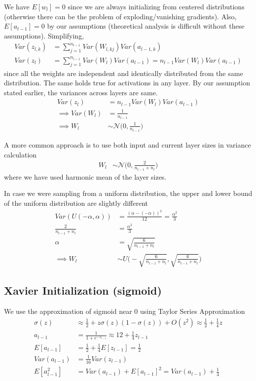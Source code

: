 \documentclass[../../deep_learning_notes.tex]{subfiles}
\begin{document}
We have $E[w_{l}] = 0$ since we are always initializing from centered distributions (otherwise there can be the problem of exploding/vanishing gradients). Also, $E[a_{l-1}] = 0$ by our assumptions (theoretical analysis is difficult without these assumptions). Simplifying,
\begin{align*}
    Var(z_{l, k}) &= \sum_{j=1}^{n_{l-1}} Var(W_{l, kj})Var(a_{l-1, k})\\
    Var(z_{l}) &= \sum_{j=1}^{n_{l-1}} Var(W_{l})Var(a_{l-1}) = n_{l-1}Var(W_{l})Var(a_{l-1})
\end{align*}
since all the weights are independent and identically distributed from the same distribution. The same holds true for activations in any layer. By our assumption stated earlier, the variances across layers are same.
\begin{align*}
    Var(z_{l}) &= n_{l-1}Var(W_{l})Var(a_{l-1})\\
    \implies Var(W_{l}) &= \frac{1}{n_{l-1}}\\
    \implies W_{l} &\sim \mathcal{N} \bigg(0, \frac{1}{n_{l-1}} \bigg)
\end{align*}

A more common approach is to use both input and current layer sizes in variance calculation
\begin{align*}
    W_{l} &\sim \mathcal{N} \bigg(0, \frac{2}{n_{l-1} + n_{l}} \bigg)
\end{align*}
where we have used harmonic mean of the layer sizes.\newline

In case we were sampling from a uniform distribution, the upper and lower bound of the uniform distribution are slightly different
\begin{align*}
    Var(U(-\alpha, \alpha)) &= \frac{(\alpha -(-\alpha))^{2}}{12} = \frac{\alpha^{2}}{3}\\
    \frac{2}{n_{l-1} + n_{l}} &= \frac{\alpha^{2}}{3}\\
    \alpha &= \sqrt{\frac{6}{n_{l-1} + n_{l}}}\\
    \implies W_{l} &\sim U\bigg(-\sqrt{\frac{6}{n_{l-1} + n_{l}}}, \sqrt{\frac{6}{n_{l-1} + n_{l}}}\bigg)
\end{align*}


\subsection{Xavier Initialization (sigmoid)}
We use the approximation of sigmoid near $0$ using Taylor Series Approximation
\begin{align*}
    \sigma(z) &\approx \frac{1}{2} + z\sigma(z)(1-\sigma(z)) + O(z^{2}) \approx \frac{1}{2} + \frac{1}{4}z\\
    a_{l-1} &= \frac{1}{1 + e^{-z_{l-1}}} \approx {1}{2} + \frac{1}{4}z_{l-1}\\
    E[a_{l-1}] &= \frac{1}{2} + \frac{1}{4}E[z_{l-1}] = \frac{1}{2}\\
    Var(a_{l-1}) &= \frac{1}{16}Var(z_{l-1})\\
    E[a_{l-1}^{2}] &= Var(a_{l-1}) + E[a_{l-1}]^{2} = Var(a_{l-1}) + \frac{1}{4}
\end{align*}
\end{document}
